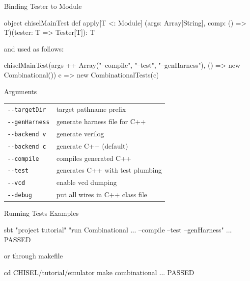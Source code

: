 \documentclass[xcolor=pdflatex,dvipsnames,table]{beamer}
\begin{document}
\begin{frame}[fragile]{Binding Tester to Module}

\begin{scala}
object chiselMainTest {
  def apply[T <: Module]
    (args: Array[String], comp: () => T)(tester: T => Tester[T]): T
}
\end{scala}

\noindent and used as follows:

\begin{scala}
chiselMainTest(args ++ Array("--compile", "--test",  "--genHarness"), 
               () => new Combinational()){ 
  c => new CombinationalTests(c) 
}
\end{scala}

\end{frame}

\begin{frame}[fragile]{ Arguments}
 
\begin{tabular}{ll}
\verb+--targetDir+ & target pathname prefix \\
\verb+--genHarness+ & generate harness file for C++ \\
\verb+--backend v+ & generate verilog \\ 
\verb+--backend c+ & generate C++ (default)\\
\verb+--compile+ & compiles generated C++ \\
\verb+--test+ & generates C++ with test plumbing  \\
\verb+--vcd+ & enable vcd dumping \\
\verb+--debug+ & put all wires in C++ class file \\
\end{tabular}

\end{frame}

\begin{frame}[fragile]{Running Tests Examples}

\begin{scala}
sbt "project tutorial" "run Combinational ... --compile --test --genHarness"
...
PASSED
\end{scala}

or through makefile

\begin{scala}
cd CHISEL/tutorial/emulator
make combinational
...
PASSED
\end{scala}
\end{frame}
\end{document}
